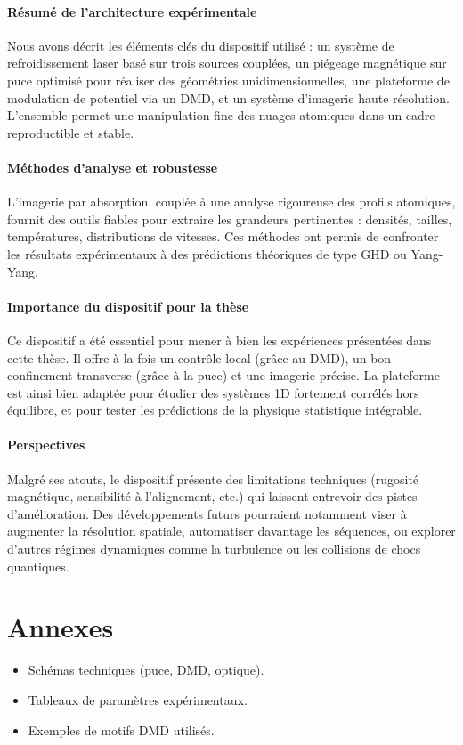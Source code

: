 \paragraph{Résumé de l’architecture expérimentale}  
Nous avons décrit les éléments clés du dispositif utilisé : un système de refroidissement laser basé sur trois sources couplées, un piégeage magnétique sur puce optimisé pour réaliser des géométries unidimensionnelles, une plateforme de modulation de potentiel via un DMD, et un système d’imagerie haute résolution. L’ensemble permet une manipulation fine des nuages atomiques dans un cadre reproductible et stable.

\paragraph{Méthodes d’analyse et robustesse}  
L’imagerie par absorption, couplée à une analyse rigoureuse des profils atomiques, fournit des outils fiables pour extraire les grandeurs pertinentes : densités, tailles, températures, distributions de vitesses. Ces méthodes ont permis de confronter les résultats expérimentaux à des prédictions théoriques de type GHD ou Yang-Yang.

\paragraph{Importance du dispositif pour la thèse}  
Ce dispositif a été essentiel pour mener à bien les expériences présentées dans cette thèse. Il offre à la fois un contrôle local (grâce au DMD), un bon confinement transverse (grâce à la puce) et une imagerie précise. La plateforme est ainsi bien adaptée pour étudier des systèmes 1D fortement corrélés hors équilibre, et pour tester les prédictions de la physique statistique intégrable.

\paragraph{Perspectives}  
Malgré ses atouts, le dispositif présente des limitations techniques (rugosité magnétique, sensibilité à l’alignement, etc.) qui laissent entrevoir des pistes d’amélioration. Des développements futurs pourraient notamment viser à augmenter la résolution spatiale, automatiser davantage les séquences, ou explorer d'autres régimes dynamiques comme la turbulence ou les collisions de chocs quantiques.



\section*{Annexes}
\begin{itemize}
    \item Schémas techniques (puce, DMD, optique).
    \item Tableaux de paramètres expérimentaux.
    \item Exemples de motifs DMD utilisés.
\end{itemize}